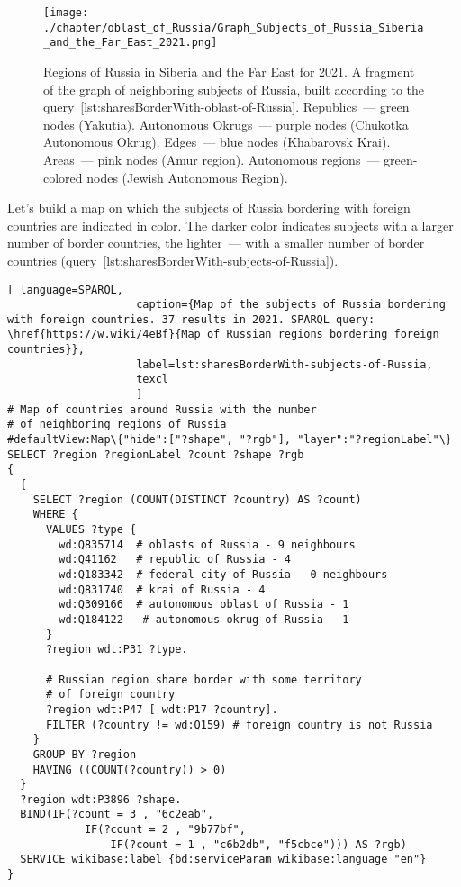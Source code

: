 \begin{figure*}[h]
	\texttt{[image: ./chapter/oblast\_of\_Russia/Graph\_Subjects\_of\_Russia\_Siberia\_and\_the\_Far\_East\_2021.png]}
	\caption[Graph of the subjects of Russia. Kaliningrad, 2021.]{Regions of Russia in Siberia and the Far East for 2021. A fragment of the graph of neighboring subjects of Russia, built according to the query~\protect\ref{lst:sharesBorderWith-oblast-of-Russia}.
	Republics~--- green nodes (Yakutia).
	Autonomous Okrugs~--- purple nodes (Chukotka Autonomous Okrug).
	Edges~--- blue nodes (Khabarovsk Krai).
	Areas~--- pink nodes (Amur region).
	Autonomous regions~--- green-colored nodes (Jewish Autonomous Region).}%
      \label{fig:sharesBorderWith-oblast-of-Russia-Kaliningrad-fig}%
\end{figure*}

\newpage
Let's build a map on which the subjects of Russia bordering with foreign countries are indicated in color. The darker color indicates subjects with a larger number of border countries, the lighter~--- with a smaller number of border countries (query~\protect\ref{lst:sharesBorderWith-subjects-of-Russia}).

\lstset{numbers=left, firstnumber=1, frame=single}
\begin{lstlisting}[ language=SPARQL, 
                    caption={Map of the subjects of Russia bordering with foreign countries. 37 results in 2021. SPARQL query: \href{https://w.wiki/4eBf}{Map of Russian regions bordering foreign countries}},
                    label=lst:sharesBorderWith-subjects-of-Russia,
                    texcl 
                    ]
# Map of countries around Russia with the number 
# of neighboring regions of Russia
#defaultView:Map\{"hide":["?shape", "?rgb"], "layer":"?regionLabel"\}
SELECT ?region ?regionLabel ?count ?shape ?rgb
{
  {
    SELECT ?region (COUNT(DISTINCT ?country) AS ?count)
    WHERE {
      VALUES ?type {
        wd:Q835714  # oblasts of Russia - 9 neighbours
        wd:Q41162   # republic of Russia - 4
        wd:Q183342  # federal city of Russia - 0 neighbours
        wd:Q831740  # krai of Russia - 4
        wd:Q309166  # autonomous oblast of Russia - 1
        wd:Q184122   # autonomous okrug of Russia - 1
      }
      ?region wdt:P31 ?type.
  
      # Russian region share border with some territory 
      # of foreign country
      ?region wdt:P47 [ wdt:P17 ?country].
      FILTER (?country != wd:Q159) # foreign country is not Russia
    }
    GROUP BY ?region
    HAVING ((COUNT(?country)) > 0)
  }
  ?region wdt:P3896 ?shape.
  BIND(IF(?count = 3 , "6c2eab", 
            IF(?count = 2 , "9b77bf", 
                IF(?count = 1 , "c6b2db", "f5cbce"))) AS ?rgb)
  SERVICE wikibase:label {bd:serviceParam wikibase:language "en"}  
}
\end{lstlisting}%

